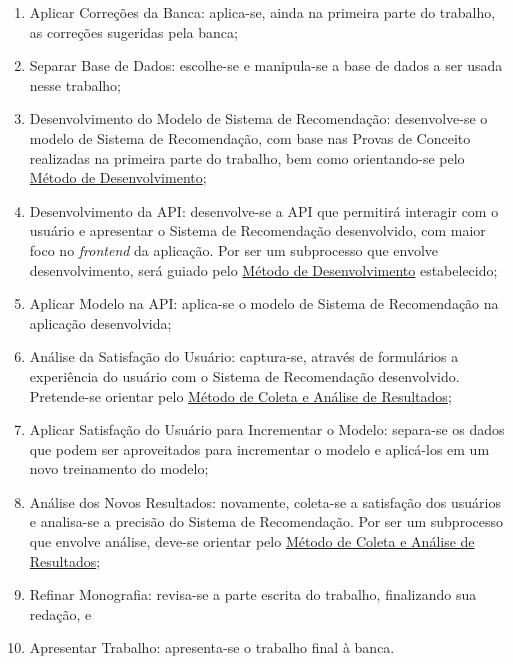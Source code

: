 \begin{enumerate}
    \item Aplicar Correções da Banca: aplica-se, ainda na primeira parte do trabalho, as correções sugeridas pela banca;
    \item Separar Base de Dados: escolhe-se e manipula-se a base de dados a ser usada nesse trabalho;
    \item Desenvolvimento do Modelo de Sistema de Recomendação: desenvolve-se o modelo de Sistema de Recomendação, 
    com base nas Provas de Conceito realizadas na primeira parte do trabalho, bem como orientando-se pelo 
    \hyperref[sec:metdev]{Método de Desenvolvimento};
    \item Desenvolvimento da API: desenvolve-se a API que permitirá interagir com o usuário e apresentar o Sistema de Recomendação
    desenvolvido, com maior foco no \textit{frontend} da aplicação. Por ser um subprocesso que envolve desenvolvimento, 
    será guiado pelo \hyperref[sec:metdev]{Método de Desenvolvimento} estabelecido;
    \item Aplicar Modelo na API: aplica-se o modelo de Sistema de Recomendação na aplicação desenvolvida;
    \item Análise da Satisfação do Usuário: captura-se, através de formulários a experiência do usuário com o Sistema de
    Recomendação desenvolvido. Pretende-se orientar pelo \hyperref[sec:meteanresul]{Método de Coleta e Análise de Resultados};
    \item Aplicar Satisfação do Usuário para Incrementar o Modelo: separa-se os dados que podem ser aproveitados 
    para incrementar o modelo e aplicá-los em um novo treinamento do modelo;
    \item Análise dos Novos Resultados: novamente, coleta-se a satisfação dos usuários e analisa-se a precisão do Sistema de 
    Recomendação. Por ser um subprocesso que envolve análise, deve-se orientar pelo 
    \hyperref[sec:meteanresul]{Método de Coleta e Análise de Resultados};
    \item Refinar Monografia: revisa-se a parte escrita do trabalho, finalizando sua redação, e
    \item Apresentar Trabalho: apresenta-se o trabalho final à banca.
\end{enumerate}

